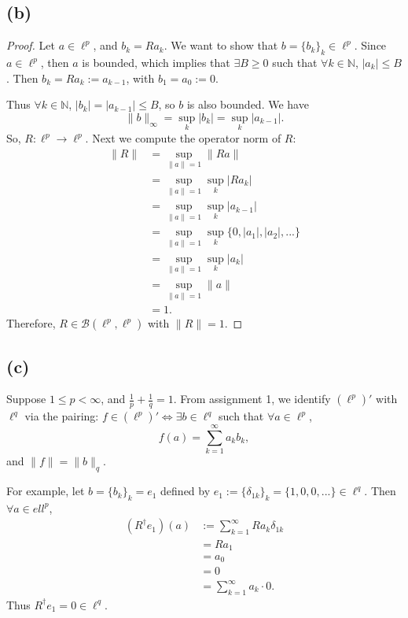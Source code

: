 \documentclass{article}
\begin{document}
\subsection*{(b)}
\begin{proof}
	Let $a \in \ell^p$, and $b_k=R a_k$. We want to show that $b = \{b_k\}_k \in \ell^p$. Since $a \in \ell^p$, then $a$ is bounded, which implies that $\exists B \geq 0$ such that $\forall k \in \mathbb{N}$, $|a_k| \leq B$. Then $b_k = Ra_k := a_{k-1}$, with $b_1 = a_0 := 0$.
	
	Thus $\forall k \in \mathbb{N}$, $|b_k| = |a_{k-1}|\leq B$, so $b$ is also bounded. We have
	\begin{equation}
		\|b\|_{\infty} = \sup_k |b_k| = \sup_k |a_{k-1}|.
	\end{equation}
	So, $R: \ell^p \rightarrow \ell^p$. Next we compute the operator norm of $R$:
	\begin{align}
		\|R\| &= \sup_{\|a\|=1}\|Ra\| \\
		&= \sup_{\|a\|=1}\sup_k |Ra_k| \\
		&= \sup_{\|a\|=1}\sup_k|a_{k-1}| \\
		&= \sup_{\|a\|=1}\sup_k \{0, |a_1|, |a_2|, ...\} \\
		&= \sup_{\|a\|=1}\sup_k |a_k| \\
		&= \sup_{\|a\|=1}\|a\| \\
		&= 1.
	\end{align}
	Therefore, $R\in\mathcal{B}(\ell^p, \ell^p)$ with $\|R\|=1$.
\end{proof}

\subsection*{(c)}
Suppose $1\leq p < \infty$, and $\frac{1}{p} + \frac{1}{q} = 1$. From assignment 1, we identify $\left(\ell^p\right)'$ with $\ell^q$ via the pairing: $f\in \left(\ell^p\right)' \iff \exists b\in \ell^q$ such that $\forall a \in \ell^p$, 
\begin{equation}
	f(a) = \sum_{k=1}^{\infty} a_k b_k,
\end{equation}
and $\|f\| = \|b\|_q$. 

For example, let $b=\{b_k\}_k=e_1$ defined by $e_1 := \{\delta_{1k}\}_k=\{1, 0, 0, ...\} \in \ell^q$. Then $\forall a \in ell^p$,
\begin{align}
	\left(R^{\dagger}e_1\right)(a) &:= \sum_{k=1}^{\infty}Ra_k \delta_{1k} \\
	&= Ra_1\\
	&= a_0  \\
	&= 0 \\
	&= \sum_{k=1}^{\infty}a_k \cdot 0.
\end{align}
Thus $R^{\dagger}e_1 = 0 \in \ell^q$. 
\end{document}
